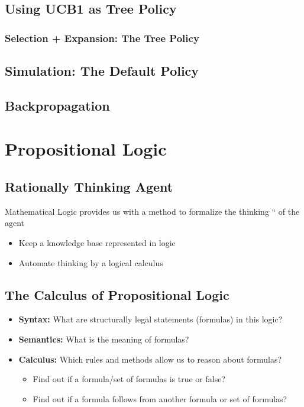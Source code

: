 \documentclass[conference, a4paper]{styles/acmsiggraph}
\begin{document}
    \subsection{Using UCB1 as Tree Policy}
        \subsubsection{Selection + Expansion: The Tree Policy}
    \subsection{Simulation: The Default Policy}
    \subsection{Backpropagation}
    
    
    
    
    
    
    
    
    
    
\section{Propositional Logic}

    \subsection{Rationally Thinking Agent}
        Mathematical Logic provides us with a method to formalize the thinking “ of the agent
        \begin{itemize}
            \item Keep a knowledge base represented in logic
            \item Automate thinking by a logical calculus
        \end{itemize}
    
    
    \subsection{The Calculus of Propositional Logic}
        \begin{itemize}
            \item \textbf{Syntax:} What are structurally legal statements (formulas) in this logic?
            \item \textbf{Semantics:} What is the meaning of formulas?
            \item \textbf{Calculus:} Which rules and methods allow us to reason about formulas?
                \begin{itemize}
                    \item Find out if a formula/set of formulas is true or false?
                    \item Find out if a formula follows from another formula or set of formulas?
                \end{itemize}
        \end{itemize}
    
\end{document}
